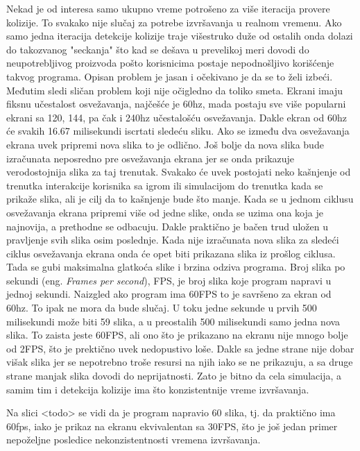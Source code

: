 \documentclass[a4paper]{article}
\begin{document}
{Nekad je od interesa samo ukupno vreme potrošeno za više iteracija provere kolizije.
To svakako nije slučaj za potrebe izvršavanja u realnom vremenu. Ako samo jedna iteracija 
detekcije kolizije traje višestruko duže od ostalih onda dolazi do takozvanog "seckanja" što
kad se dešava  u prevelikoj meri dovodi do neupotrebljivog proizvoda pošto korisnicima postaje nepodnošljivo
korišćenje takvog programa.
Opisan problem je jasan i očekivano je da se to želi izbeći. 
Međutim sledi sličan problem koji nije očigledno da toliko smeta.
Ekrani imaju fiksnu učestalost osvežavanja, najčešće je 60hz, mada postaju sve više popularni 
ekrani sa 120, 144, pa čak i 240hz učestalošću osvežavanja. Dakle ekran od 60hz će svakih 
16.67 milisekundi iscrtati sledeću sliku. Ako se između dva osvežavanja ekrana uvek pripremi
nova slika to je odlično. 
Još bolje da nova slika bude izračunata neposredno pre osvežavanja ekrana jer se onda 
prikazuje verodostojnija slika za taj trenutak. 
Svakako će uvek postojati neko kašnjenje od trenutka interakcije korisnika sa igrom ili simulacijom do
trenutka kada se prikaže slika, ali je cilj da to kašnjenje bude što manje. 
Kada se u jednom ciklusu osvežavanja ekrana pripremi više od jedne slike, onda se uzima ona koja je najnovija,
a prethodne se odbacuju. 
Dakle praktično je bačen trud uložen u pravljenje svih slika osim poslednje.
Kada nije izračunata nova slika za sledeći ciklus osvežavanja ekrana onda će opet biti prikazana slika
iz prošlog ciklusa. Tada se gubi maksimalna glatkoća slike i brzina odziva programa. 
Broj slika po sekundi (eng. {\em Frames per second}), FPS, je broj slika koje program napravi u jednoj sekundi.
Naizgled ako program ima 60FPS to je savršeno za ekran od 60hz. To ipak ne mora da bude slučaj.
U toku jedne sekunde u prvih 500 milisekundi može biti 59 slika, a u preostalih 500 milisekundi samo jedna 
nova slika. To zaista jeste 60FPS, ali ono što je prikazano na ekranu nije mnogo bolje od 2FPS,
što je prektično uvek nedopustivo loše. 
Dakle sa jedne strane nije dobar višak slika jer se nepotrebno troše resursi na njih iako se ne prikazuju, 
a sa druge strane manjak slika dovodi do neprijatnosti.
Zato je bitno da cela simulacija, a samim tim i detekcija kolizije ima što konzistentnije vreme izvršavanja.

Na slici <todo> se vidi da je program napravio 60 slika, tj. da praktično ima 60fps, iako je prikaz na ekranu 
ekvivalentan sa 30FPS, što je još jedan primer nepoželjne posledice nekonzistentnosti vremena izvršavanja. 

}
\end{document}
